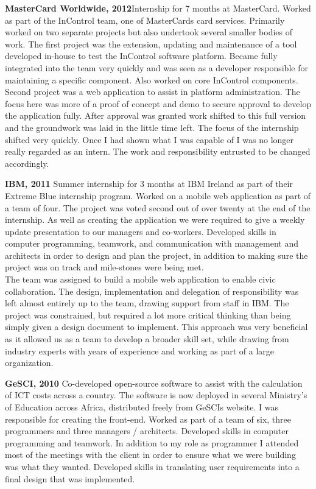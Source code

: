 \documentclass{res}
\begin{document}
\begin{resume}
    {\bf MasterCard Worldwide, 2012}Internship for 7 months at MasterCard. Worked as part of the InControl team, one of MasterCards card services. Primarily worked on two separate projects but also undertook several smaller bodies of work. The first project was the extension, updating and maintenance of a tool developed in-house to test the InControl software platform. Became fully integrated into the team very quickly and was seen as a developer responsible for maintaining a specific component. Also worked on core InControl components. 
    Second project was a web application to assist in platform administration. The focus here was more of a proof of concept and demo to secure approval to develop the application fully. After approval was granted work shifted to this full version and the groundwork was laid in the little time left.
    The focus of the internship shifted very quickly. Once I had shown what I was capable of I was no longer really regarded as an intern. The work and responsibility entrusted to be changed accordingly. 

    {\bf IBM, 2011 }Summer internship for 3 months at IBM Ireland as part of their Extreme Blue internship program. Worked on a mobile web application as part of a team of four. The project was voted second out of over twenty at the end of the internship. As well as creating the application we were required to give a weekly update presentation to our managers and co-workers. Developed skills in computer programming, teamwork, and communication with management and architects in order to design and plan the project, in addition to making sure the project was on track and mile-stones were being met.\\
     The team was assigned to build a mobile web application to enable civic collaboration. The design, implementation and delegation of responsibility was left almost entirely up to the team, drawing support from staff in IBM. The project was constrained, but required a lot more critical thinking than being simply given a design document to implement. This approach was very beneficial as it allowed us as a team to develop a broader skill set, while drawing from industry experts with years of experience and working as part of a large organization.
 
    {\bf GeSCI, 2010} Co-developed open-source software to assist with the calculation of ICT costs across a country. The software is now deployed in several Ministry's of Education across Africa, distributed freely from GeSCIs website. I was responsible for creating the front-end. Worked as part of a team of six, three programmers and three managers / architects. Developed skills in computer programming and teamwork. In addition to my role as programmer I attended most of the meetings with the client in order to ensure what we were building was what they wanted. Developed skills in translating user requirements into a final design that was implemented.


\end{resume}
\end{document}
